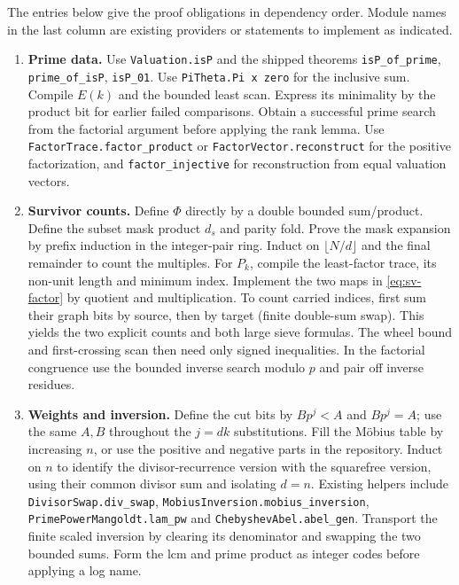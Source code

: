 The entries below give the proof obligations in dependency order. Module names in the last column are existing providers or statements to implement as indicated.
\begin{enumerate}
\item \textbf{Prime data.} Use \texttt{Valuation.isP} and the shipped theorems \texttt{isP\_of\_prime}, \texttt{prime\_of\_isP}, \texttt{isP\_01}. Use \texttt{PiTheta.Pi x zero} for the inclusive sum. Compile $E(k)$ and the bounded least scan. Express its minimality by the product bit for earlier failed comparisons. Obtain a successful prime search from the factorial argument before applying the rank lemma. Use \texttt{FactorTrace.factor\_product} or \texttt{FactorVector.reconstruct} for the positive factorization, and \texttt{factor\_injective} for reconstruction from equal valuation vectors.
\item \textbf{Survivor counts.} Define $\Phi$ directly by a double bounded sum/product. Define the subset mask product $d_s$ and parity fold. Prove the mask expansion by prefix induction in the integer-pair ring. Induct on $\lfloor N/d\rfloor$ and the final remainder to count the multiples. For $P_k$, compile the least-factor trace, its non-unit length and minimum index. Implement the two maps in \eqref{eq:sv-factor} by quotient and multiplication. To count carried indices, first sum their graph bits by source, then by target (finite double-sum swap). This yields the two explicit counts and both large sieve formulas. The wheel bound and first-crossing scan then need only signed inequalities. In the factorial congruence use the bounded inverse search modulo $p$ and pair off inverse residues.
\item \textbf{Weights and inversion.} Define the cut bits by $Bp^j<A$ and $Bp^j=A$; use the same $A,B$ throughout the $j=dk$ substitutions. Fill the Möbius table by increasing $n$, or use the positive and negative parts in the repository. Induct on $n$ to identify the divisor-recurrence version with the squarefree version, using their common divisor sum and isolating $d=n$. Existing helpers include \texttt{DivisorSwap.div\_swap}, \texttt{MobiusInversion.mobius\_inversion}, \texttt{PrimePowerMangoldt.lam\_pw} and \texttt{ChebyshevAbel.abel\_gen}. Transport the finite scaled inversion by clearing its denominator and swapping the two bounded sums. Form the lcm and prime product as integer codes before applying a log name.

\end{enumerate}
